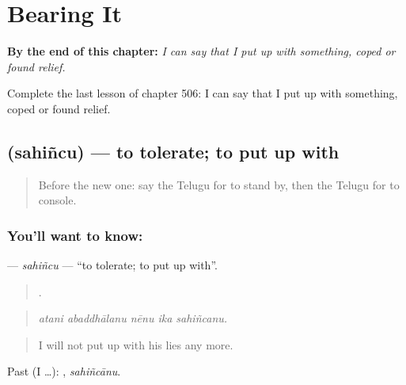 
\chapter{Bearing It}
\label{ch:te-bearing-it}

\begin{chapteropening}
\textbf{By the end of this chapter:} \emph{I can say that I put up with something, coped or found relief.}

Complete the last lesson of chapter 506: I can say that I put up with something, coped or found relief.
\end{chapteropening}

\section[\texorpdfstring{\te{సహించు} (sahiñcu)}{సహించు (sahiñcu)}]{ (sahiñcu) — to tolerate; to put up with}

\label{lesson:TE-C506-sahincu}



\begin{quote}
Before the new one: say the Telugu for to stand by, then the Telugu for to console.
\end{quote}

\subsection*{You'll want to know: }
\textbf{} — \emph{sahiñcu} — \textquotedblleft{}to tolerate; to put up with\textquotedblright{}.

\begin{quote}
    .
\end{quote}

\begin{quote}
\emph{atani abaddhālanu nēnu ika sahiñcanu.}
\end{quote}

\begin{quote}
I will not put up with his lies any more.
\end{quote}

Past (I …): , \emph{sahiñcānu}.


